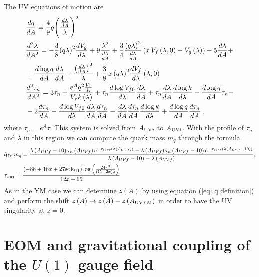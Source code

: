 \documentclass[a4paper,12pt]{article}
\begin{document}
The UV equations of motion are
\begin{align}
&\frac{dq}{dA} =  \frac{4}{9} q {\left(\frac{\frac{d\lambda}{dA}}{\lambda}\right)}^2 \\
&\frac{d^2\lambda}{dA^2} = -\frac{3}{8}  {\left(q \lambda \right)}^2 \frac{d V_g}{d\lambda} + 9 \frac{\lambda^2}{\frac{d\lambda}{dA}} + \frac{3}{4} \frac{{\left(q \lambda \right)}^2}{\frac{d\lambda}{dA}} \left( x \, V_f\left(\lambda, 0\right) - V_g \left(\lambda\right) \right) - 5 \frac{d\lambda}{dA}  + \\
& + \frac{d \log q}{dA} \frac{d\lambda}{d A} + \frac{{\left( \frac{d\lambda}{dA}\right)}^2}{\lambda} + \frac{3}{8} \, x \, {\left( q \lambda \right)}^2 \frac{d V_f}{d\lambda} \left(\lambda, 0 \right) \\ \notag
& \frac{d^2 \tau_n}{dA^2} = 3 \tau_n  +  \frac{e^A q^2 \frac{V_\tau}{d\tau} }{V_\tau k\left(\lambda\right)} + \tau_n \frac{d \log V_{f0}}{d\lambda} \frac{d\lambda}{dA} + \tau_n \frac{d\lambda}{dA} \frac{d \log k}{d\lambda} -\frac{d\log q}{d A}  \tau_n  - \\
& - 2 \frac{d\tau_n}{d A} - \frac{d \log V_{f0}}{d\lambda} \frac{d\lambda}{dA} \frac{d\tau_n}{dA}  - \frac{d\lambda}{dA} \frac{d\tau_n}{dA} \frac{d \log k}{d\lambda} + \frac{d\log q}{d A}  \frac{d \tau_n}{dA} \, ,
\end{align}
where $\tau_n = e^A \tau$. This system is solved from $A_{\rm{UVc}}$ to $A_{\rm{UVf}}$. With the profile of $\tau_n$ and $\lambda$ in this region we can compute the quark mass $m_q$ through the formula
\begin{align}
&l_{\rm{UV}} \, m_q = \frac{\lambda \left(A_{UVf} - 10\right) \tau_n\left(A_{UVf}\right)e^{- \tau_{corr}\left(\lambda\left(A_{UVf}\right)\right)} - \lambda \left(A_{UVf} \right) \tau_n\left(A_{UVf} - 10\right)e^{- \tau_{corr}\left(\lambda\left(A_{UVf} - 10\right)\right)} }{\lambda\left(A_{UVf} - 10\right) - \lambda\left(A_{UVf}\right)}, \\
& \tau_{\rm{corr}} = \frac{\left(-88 + 16 x + 27 \rm{sc} \, k_{\rm{U1}}\right) \log\left( \frac{24 \pi^2}{\left(11 - 2 x\right) \lambda}\right)}{12 x - 66}
\end{align}
As in the YM case we can determine $z\left(A\right)$ by using equation (\ref{eq: q definition}) and perform the shift $z\left(A\right) \to z\left(A\right) - z\left(A_{\rm{UVYM}} \right) $ in order to have the UV singularity at $z = 0$.

\section{EOM and gravitational coupling of the $U(1)$ gauge field}
\label{appendix:b}
\end{document}
